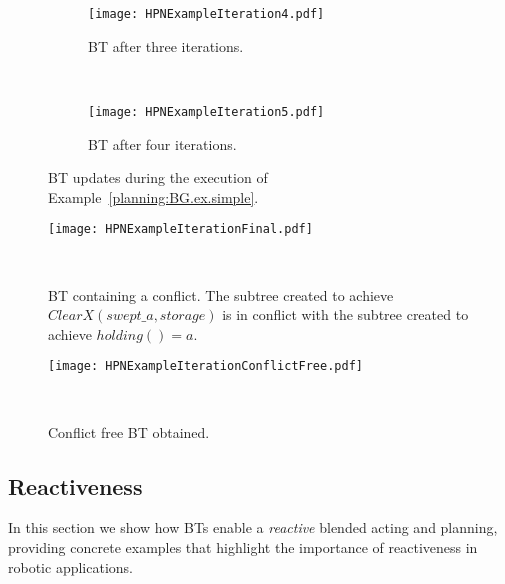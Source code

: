 \begin{figure}[h!]
        \centering
        \begin{subfigure}[b]{0.75\columnwidth}
                \centering
\texttt{[image: HPNExampleIteration4.pdf]}
                \caption{BT after three iterations.}
                \label{planning:BG.fig.it3}
        \end{subfigure}%
       ~ %
       
        \begin{subfigure}[b]{1\columnwidth}
                \centering
\texttt{[image: HPNExampleIteration5.pdf]}
                \caption{BT after four iterations.}
                \label{planning:BG.fig.it4}              
        \end{subfigure}
        
        \caption{BT updates during the execution of Example~\ref{planning:BG.ex.simple}.}
\end{figure}
\begin{landscape}
\begin{figure}[h!]
        \centering
\texttt{[image: HPNExampleIterationFinal.pdf]}
        \caption{BT containing a conflict. The subtree created to achieve $ClearX(swept\_a,storage)$ is in conflict with the subtree created to achieve $holding()=a$. }
         \label{planning:BG.fig.it6}              
        ~ %
\end{figure}
\end{landscape}

\begin{landscape}

\begin{figure}[h]
        \centering
\texttt{[image: HPNExampleIterationConflictFree.pdf]}
        \caption{Conflict free BT obtained.}
         \label{planning:BG.fig.it7}              
        ~ %
\end{figure}
\end{landscape}

\subsection{Reactiveness}
\label{planning:RE}
In this section we show how BTs enable a \emph{reactive} blended acting and planning, providing concrete examples that highlight the importance of reactiveness in robotic applications.

